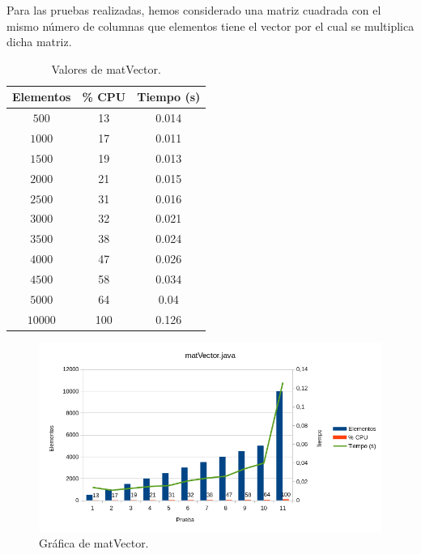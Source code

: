 \documentclass[12pt,letterpaper]{article}
\begin{document}
Para las pruebas realizadas, hemos considerado una matriz cuadrada con el mismo número de columnas que elementos tiene el vector por el cual se multiplica dicha matriz.
\begin{center}
	\begin{table}[htbp]
		\begin{center}
			\begin{tabular}{|c|c|c|}
				\hline
				\textbf{Elementos} & \textbf{\% CPU} & \textbf{Tiempo (s)}  \\
				\hline 
				$500$ & 13 & 0.014\\ \hline	
				$1000$ & 17 & 0.011\\ \hline
				$1500$ & 19 & 0.013\\ \hline
				$2000$ & 21 & 0.015\\ \hline
				$2500$ & 31 & 0.016\\ \hline
				$3000$ & 32 & 0.021\\ \hline
				$3500$ & 38 & 0.024\\ \hline
				$4000$ & 47 & 0.026\\ \hline
				$4500$ & 58 & 0.034\\ \hline
				$5000$ & 64 & 0.04\\ \hline				
				$10000$ & 100 & 0.126\\ \hline	
			\end{tabular}
			\caption{Valores de matVector.}
			\label{tabla:Valores de matVector}
		\end{center}
	\end{table}
\end{center}
\begin{figure}[h]
	\begin{center}
		\includegraphics[scale=0.8]{matVector.png}
		\caption{Gráfica de matVector.}
		\label{fig: matVector}
	\end{center}
\end{figure}
\end{document}
